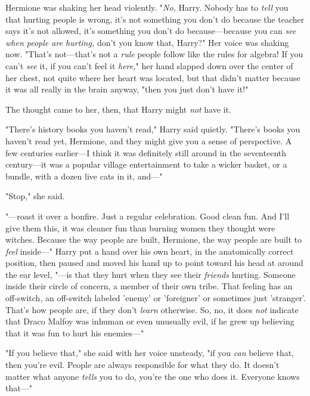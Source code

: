 Hermione was shaking her head violently. "\emph{No,} Harry. Nobody has to 
\emph{tell} you that hurting people is wrong, it's not something you don't do 
because the teacher says it's not allowed, it's something you don't do 
because---because you can \emph{see when people are hurting,} don't you know 
that, Harry?" Her voice was shaking now. "That's not---that's not a \emph{rule} 
people follow like the rules for algebra! If you can't \emph{see} it, if you 
can't feel it \emph{here,}" her hand slapped down over the center of her chest, 
not quite where her heart was located, but that didn't matter because it was 
all really in the brain anyway, "then you just don't have it!"

The thought came to her, then, that Harry might \emph{not} have it.

"There's history books you haven't read," Harry said quietly. "There's books 
you haven't read yet, Hermione, and they might give you a sense of perspective. 
A few centuries earlier---I think it was definitely still around in the 
seventeenth century---it was a popular village entertainment to take a wicker 
basket, or a bundle, with a dozen live cats in it, and---"

"Stop," she said.

"---roast it over a bonfire. Just a regular celebration. Good clean fun. And 
I'll give them this, it was cleaner fun than burning women they thought were 
witches. Because the way people are built, Hermione, the way people are built 
to \emph{feel} inside---" Harry put a hand over his own heart, in the 
anatomically correct position, then paused and moved his hand up to point 
toward his head at around the ear level, "---is that they hurt when they see 
their \emph{friends} hurting. Someone inside their circle of concern, a member 
of their own tribe. That feeling has an off-switch, an off-switch labeled 
'enemy' or 'foreigner' or sometimes just 'stranger'. That's how people are, if 
they don't \emph{learn} otherwise. So, no, it does \emph{not} indicate that 
Draco Malfoy was inhuman or even unusually evil, if he grew up believing that 
it was fun to hurt his enemies---"

"If you believe that\emph{,}" she said with her voice unsteady, "if you 
\emph{can} believe that, then you're evil. People are always responsible for 
what they do. It doesn't matter what anyone \emph{tells} you to do, you're the 
one who does it. Everyone knows that---"

